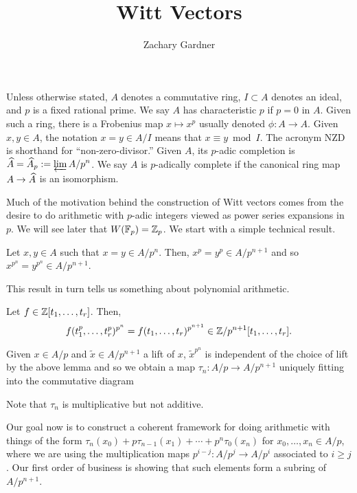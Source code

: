 \documentclass[11pt]{article}
\newcommand{\F}{\mathbb{F}}
\begin{document}
\title{Witt Vectors}
\author{Zachary Gardner}
\date{}
\maketitle

Unless otherwise stated, $A$ denotes a commutative ring, $I\subset A$ denotes an ideal, and $p$ is a fixed rational prime. We say $A$ has characteristic $p$ if $p=0$ in $A$. Given such a ring, there is a Frobenius map $x\mapsto x^p$ usually denoted $\phi: A\to A$. Given $x,y\in A$, the notation $x=y\in A/I$ means that $x\equiv y\bmod{I}$. The acronym NZD is shorthand for ``non-zero-divisor.'' Given $A$, its $p$-adic completion is $\widehat{A}=\widehat{A}_p:=\displaystyle\varprojlim A/p^n$. We say $A$ is $p$-adically complete if the canonical ring map $A\to\widehat{A}$ is an isomorphism.

Much of the motivation behind the construction of Witt vectors comes from the desire to do arithmetic with $p$-adic integers viewed as power series expansions in $p$. We will see later that $W(\F_p)=\Z_p$. We start with a simple technical result.

\begin{lemma}
Let $x,y\in A$ such that $x=y\in A/p^n$. Then, $x^p=y^p\in A/p^{n+1}$ and so $x^{p^n}=y^{p^n}\in A/p^{n+1}$.
\end{lemma}

This result in turn tells us something about polynomial arithmetic.

\begin{corollary}
Let $f\in\mathbb{Z}[t_1,\ldots,t_r]$. Then, 
$$f(t_1^p,\ldots,t_r^p)^{p^n}=f(t_1,\ldots,t_r)^{p^{n+1}}\in\mathbb{Z}/p^{n+1}[t_1,\ldots,t_r].$$
\end{corollary}

Given $x\in A/p$ and $\tilde{x}\in A/p^{n+1}$ a lift of $x$, $\tilde{x}^{p^n}$ is independent of the choice of lift by the above lemma and so we obtain a map $\tau_n: A/p\to A/p^{n+1}$ uniquely fitting into the commutative diagram 
\begin{center}
\end{center}
Note that $\tau_n$ is multiplicative but not additive.

Our goal now is to construct a coherent framework for doing arithmetic with things of the form $\tau_n(x_0)+p\tau_{n-1}(x_1)+\cdots+p^n\tau_0(x_n)$ for $x_0,\ldots,x_n\in A/p$, where we are using the multiplication maps $p^{i-j}: A/p^j\to A/p^i$ associated to $i\geq j$. Our first order of business is showing that such elements form a subring of $A/p^{n+1}$.
\end{document}
